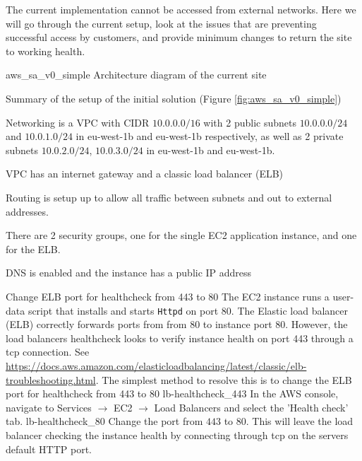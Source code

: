 

The current implementation cannot be accessed from external networks. Here we will go through the current setup, look at the issues that are preventing successful access by customers, and provide minimum changes to return the site to working health.

\architecture
{aws_sa_v0_simple}
{Architecture diagram of the current site}
	\FloatBarrier
	
\changes
{Summary of the setup of the initial solution (Figure \ref{fig:aws_sa_v0_simple})}
{
	\item Networking is a VPC with CIDR $10.0.0.0/16$ with 2 public subnets $10.0.0.0/24$ and  $10.0.1.0/24$ in eu-west-1b and eu-west-1b respectively, as well as 2 private subnets $10.0.2.0/24$, $10.0.3.0/24$ in eu-west-1b and eu-west-1b. 

	\item VPC has an internet gateway and a classic load balancer (ELB)
	
	\item Routing is setup up to allow all traffic between subnets and out to external addresses.
	
	\item There are 2 security groups, one for the single EC2 application instance, and one for the ELB.
	
	\item DNS is enabled and the instance has a public IP address
}




{Change ELB port for healthcheck from 443 to 80}
{
	The EC2 instance runs a user-data script that installs and starts \texttt{Httpd} on port $80$. The Elastic load balancer (ELB) correctly forwards ports
	from from 80 to instance port $80$. However, the load balancers healthcheck looks to verify instance health on port 443 through a tcp connection. See 	\url{https://docs.aws.amazon.com/elasticloadbalancing/latest/classic/elb-troubleshooting.html}. The simplest method to resolve this is to change the ELB port for healthcheck from 443 to 80
}
{
	\imagefigsinglebox
	{lb-healthcheck_443}
	{In the AWS console, navigate to Services  $\rightarrow$ EC2  $\rightarrow$ Load Balancers and select the 'Health check' tab.}
	\imagefigsinglebox
	{lb-healthcheck_80}
	{Change the port from $443$ to $80$. This will leave the load balancer checking the instance health by connecting through tcp on the servers default HTTP port.}
}
\FloatBarrier



